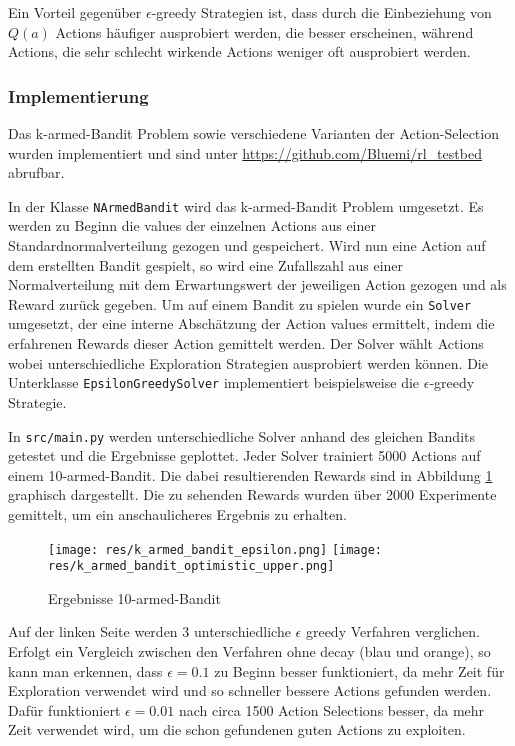 \documentclass[11pt]{scrartcl}
\begin{document}
Ein Vorteil gegenüber $\epsilon$-greedy Strategien ist, dass durch die Einbeziehung von
$Q(a)$ Actions häufiger ausprobiert werden, die besser erscheinen, während Actions, die
sehr schlecht wirkende Actions weniger oft ausprobiert werden.

\subsubsection{Implementierung}
Das k-armed-Bandit Problem sowie verschiedene Varianten der Action-Selection wurden
implementiert und sind unter \url{https://github.com/Bluemi/rl_testbed} abrufbar.

In der Klasse \lstinline!NArmedBandit! wird das k-armed-Bandit Problem umgesetzt. Es
werden zu Beginn die values der einzelnen Actions aus einer Standardnormalverteilung
gezogen und gespeichert. Wird nun eine Action auf dem erstellten Bandit gespielt, so wird
eine Zufallszahl aus einer Normalverteilung mit dem Erwartungswert der jeweiligen Action
gezogen und als Reward zurück gegeben.
Um auf einem Bandit zu spielen wurde ein \lstinline!Solver! umgesetzt, der eine interne
Abschät\-zung der Action values ermittelt, indem die erfahrenen Rewards dieser Action
gemittelt werden. Der Solver wählt Actions wobei unterschiedliche Exploration Strategien
ausprobiert werden können. Die Unterklasse \lstinline!EpsilonGreedySolver! implementiert
beispielsweise die $\epsilon$-greedy Strategie.

In \lstinline!src/main.py! werden unterschiedliche Solver anhand des gleichen Bandits
getestet und die Ergebnisse geplottet. Jeder Solver trainiert 5000 Actions auf einem
10-armed-Bandit. Die dabei resultierenden Rewards sind in Abbildung
\ref{fig:karmed_bandit} graphisch dargestellt. Die zu sehenden Rewards wurden über 2000
Experimente gemittelt, um ein anschaulicheres Ergebnis zu erhalten.

\begin{figure}[htp]
\centering
\texttt{[image: res/k\_armed\_bandit\_epsilon.png]}
\texttt{[image: res/k\_armed\_bandit\_optimistic\_upper.png]}
\caption{Ergebnisse 10-armed-Bandit}
\label{fig:karmed_bandit}
\end{figure}

\noindent
Auf der linken Seite werden 3 unterschiedliche $\epsilon$ greedy Verfahren verglichen.
Erfolgt ein Vergleich zwischen den Verfahren ohne decay (blau und orange), so kann man
erkennen, dass $\epsilon = 0.1$ zu Beginn besser funktioniert, da mehr Zeit für
Exploration verwendet wird und so schneller bessere Actions gefunden werden. Dafür
funktioniert $\epsilon = 0.01$ nach circa 1500 Action Selections besser, da mehr Zeit
verwendet wird, um die schon gefundenen guten Actions zu exploiten.
\end{document}

